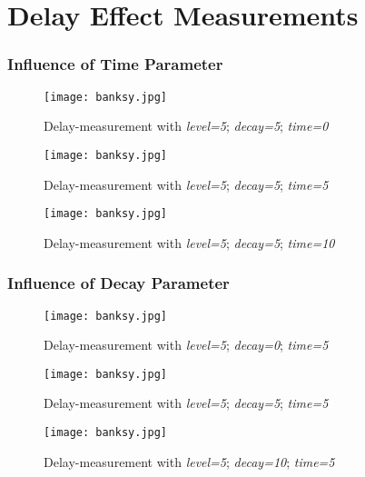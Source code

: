 \section{Delay Effect Measurements}\label{DelayAppendix}

\subsubsection{Influence of Time Parameter}

\begin{figure}[H]
	\centering \texttt{[image: banksy.jpg]}
	\caption[Menu]{Delay-measurement with \textit{level=5}; \textit{decay=5}; \textit{time=0}}
	\label{fig:DelayExemptime550}
\end{figure}

\begin{figure}[H]
	\centering \texttt{[image: banksy.jpg]}
	\caption[Menu]{Delay-measurement with \textit{level=5}; \textit{decay=5}; \textit{time=5}}
	\label{fig:DelayExemptime555}
\end{figure}

\begin{figure}[H]
	\centering \texttt{[image: banksy.jpg]}
	\caption[Menu]{Delay-measurement with \textit{level=5}; \textit{decay=5}; \textit{time=10}}
	\label{fig:DelayExemptime5510}
\end{figure}

\subsubsection{Influence of Decay Parameter}

\begin{figure}[H]
	\centering \texttt{[image: banksy.jpg]}
	\caption[Menu]{Delay-measurement with \textit{level=5}; \textit{decay=0}; \textit{time=5}}
	\label{fig:DelayExempdecay550}
\end{figure}

\begin{figure}[H]
	\centering \texttt{[image: banksy.jpg]}
	\caption[Menu]{Delay-measurement with \textit{level=5}; \textit{decay=5}; \textit{time=5}}
	\label{fig:DelayExempdecay555}
\end{figure}

\begin{figure}[H]
	\centering \texttt{[image: banksy.jpg]}
	\caption[Menu]{Delay-measurement with \textit{level=5}; \textit{decay=10}; \textit{time=5}}
	\label{fig:DelayExempdecay5510}
\end{figure}

